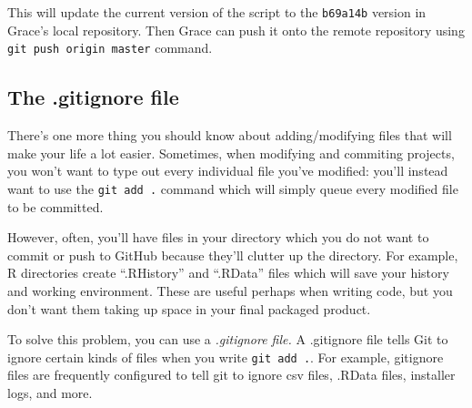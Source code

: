 \documentclass[]{book}
\newenvironment{Shaded}{\begin{snugshade}}{\end{snugshade}}
\newcommand{\StringTok}[1]{\textcolor[rgb]{0.31,0.60,0.02}{#1}}
\newcommand{\OperatorTok}[1]{\textcolor[rgb]{0.81,0.36,0.00}{\textbf{#1}}}
\newcommand{\NormalTok}[1]{#1}
\begin{document}
\begin{Shaded}
\end{Shaded}

This will update the current version of the script to the
\texttt{b69a14b} version in Grace's local repository. Then Grace can
push it onto the remote repository using
\texttt{git\ push\ origin\ master} command.

\subsection{The .gitignore file}\label{the-.gitignore-file}

There's one more thing you should know about adding/modifying files that
will make your life a lot easier. Sometimes, when modifying and
commiting projects, you won't want to type out every individual file
you've modified: you'll instead want to use the \texttt{git\ add\ .}
command which will simply queue every modified file to be committed.

\begin{Shaded}
\end{Shaded}

However, often, you'll have files in your directory which you do not
want to commit or push to GitHub because they'll clutter up the
directory. For example, R directories create ``.RHistory'' and
``.RData'' files which will save your history and working environment.
These are useful perhaps when writing code, but you don't want them
taking up space in your final packaged product.

To solve this problem, you can use a \emph{.gitignore file.} A
.gitignore file tells Git to ignore certain kinds of files when you
write \texttt{git\ add\ .}. For example, gitignore files are frequently
configured to tell git to ignore csv files, .RData files, installer
logs, and more.
\end{document}
